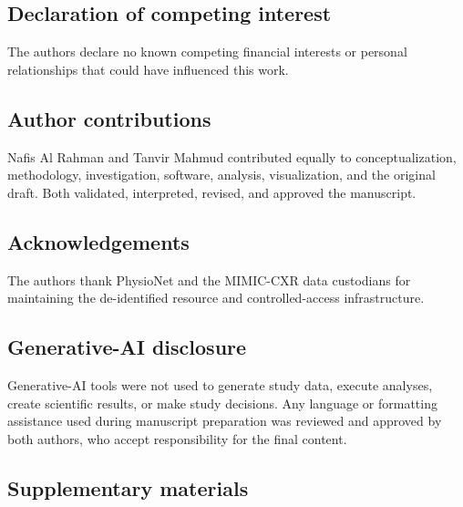 \subsection*{Declaration of competing interest}
The authors declare no known competing financial interests or personal
relationships that could have influenced this work.

\subsection*{Author contributions}
Nafis Al Rahman and Tanvir Mahmud contributed equally to conceptualization,
methodology, investigation, software, analysis, visualization, and the original
draft. Both validated, interpreted, revised, and approved the manuscript.

\subsection*{Acknowledgements}
The authors thank PhysioNet and the MIMIC-CXR data custodians for maintaining
the de-identified resource and controlled-access infrastructure.

\subsection*{Generative-AI disclosure}
Generative-AI tools were not used to generate study data, execute analyses,
create scientific results, or make study decisions. Any language or formatting
assistance used during manuscript preparation was reviewed and approved by both
authors, who accept responsibility for the final content.

\subsection*{Supplementary materials}

